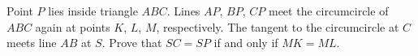 Point $P$ lies inside triangle $ABC$. Lines $AP$, $BP$, $CP$ meet the circumcircle of $ABC$ again at points $K$, $L$, $M$, respectively. The tangent to the circumcircle at $C$ meets line $AB$ at $S$. Prove that $SC = SP$ if and only if $MK = ML$.
